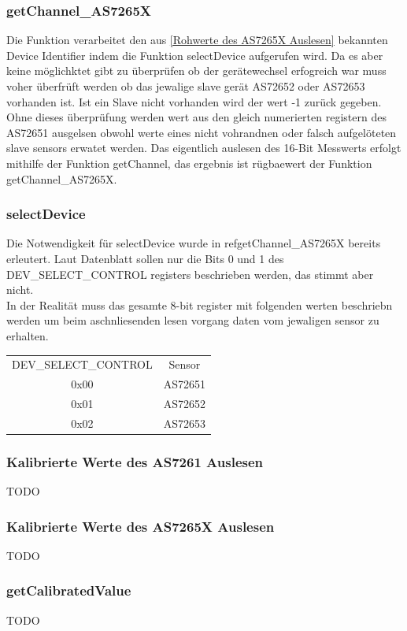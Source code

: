 \subsubsection{getChannel\_AS7265X}
Die Funktion verarbeitet den aus \ref{Rohwerte des AS7265X Auslesen} bekannten Device Identifier indem die Funktion selectDevice aufgerufen wird.
	Da es aber keine möglichktet gibt zu überprüfen ob der gerätewechsel erfogreich war muss voher überfrüft werden ob das jewalige slave gerät AS72652 oder AS72653 vorhanden ist.
	Ist ein Slave nicht vorhanden wird der wert -1 zurück gegeben.
	Ohne dieses überprüfung werden wert aus den gleich numerierten registern des AS72651 ausgelsen obwohl werte eines nicht vohrandnen oder falsch aufgelöteten slave sensors erwatet werden.
	Das eigentlich auslesen des 16-Bit Messwerts erfolgt mithilfe der Funktion getChannel, das ergebnis ist rügbaewert der Funktion getChannel\_AS7265X.

\subsubsection{selectDevice}
Die Notwendigkeit für selectDevice wurde in ref{getChannel\_AS7265X} bereits erleutert.
Laut Datenblatt sollen nur die Bits 0 und 1 des DEV\_SELECT\_CONTROL registers beschrieben werden, das stimmt aber nicht.\\
In der Realität muss das gesamte 8-bit register mit folgenden werten beschriebn werden um beim aschnliesenden lesen vorgang  daten vom jewaligen sensor zu erhalten.
\begin{center}
\begin{tabular}{ c c }
 	DEV\_SELECT\_CONTROL & Sensor \\ 
 	0x00 & AS72651 \\  
 	0x01 & AS72652 \\
 	0x02 & AS72653 \\  
\end{tabular}
\end{center}

\subsubsection{Kalibrierte Werte des AS7261 Auslesen}
TODO
\subsubsection{Kalibrierte Werte des AS7265X Auslesen}
TODO
\subsubsection{getCalibratedValue}
TODO
